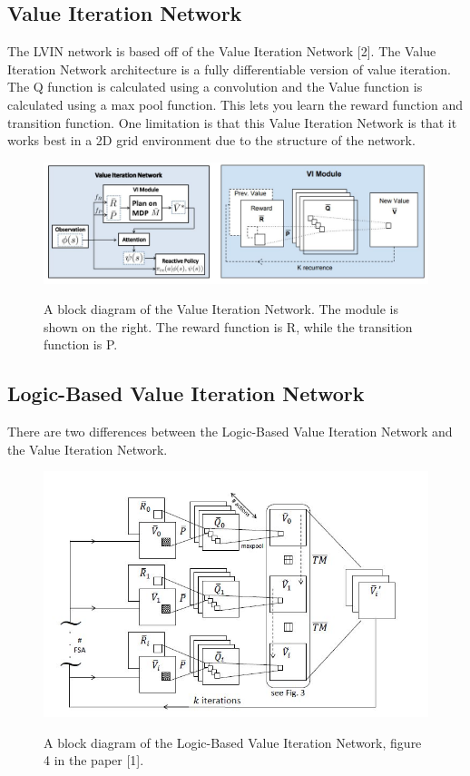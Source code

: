 \documentclass[letterpaper, 10 pt, conference]{ieeeconf}  %
\begin{document}
\subsection{Value Iteration Network} 
The LVIN network is based off of the Value Iteration Network [2]. The Value Iteration Network architecture is a fully differentiable version of value iteration. The Q function is calculated using a convolution and the Value function is calculated using a max pool function. This lets you learn the reward function and transition function. One limitation is that this Value Iteration Network is that it works best in a 2D grid environment due to the structure of the network.
\begin{figure}[h]
 \centering
 \includegraphics[scale=.33]{ValueIterationNetwork.JPG}\\
 \caption{A block diagram of the Value Iteration Network. The module is shown on the right. The reward function is R, while the transition function is P.}
\end{figure}
\newpage
\subsection{Logic-Based Value Iteration Network}
There are two differences between the Logic-Based Value Iteration Network and the Value Iteration Network. 
\begin{figure}[h]
 \centering
 \includegraphics[scale=.5]{LVIN.JPG}\\
 \caption{A block diagram of the Logic-Based Value Iteration Network, figure 4 in the paper [1].}
\end{figure}
\end{document}
